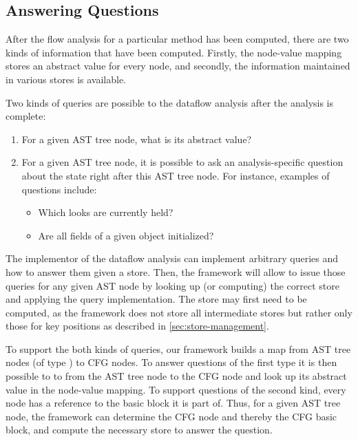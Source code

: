 \subsection{Answering Questions}
\begin{new}
After the flow analysis for a particular method has been computed, there are two kinds of
information that have been computed.  Firstly, the node-value mapping stores an abstract
value for every node, and secondly, the information maintained in various stores is
available.

Two kinds of queries are possible to the dataflow analysis after the analysis is complete:
\begin{enumerate}
    \item For a given AST tree node, what is its abstract value?
    \item For a given AST tree node, it is possible to ask an analysis-specific question
    about the state right after this AST tree node. For instance, examples of questions
    include:
    \begin{itemize}
        \item Which looks are currently held?
        \item Are all fields of a given object initialized?
    \end{itemize}
\end{enumerate}

The implementor
of the dataflow analysis can implement arbitrary queries and how to answer them
given a store. Then, the framework will allow to issue those queries for
any given AST node by looking up (or computing) the correct store and applying the query
implementation.
The store may first need to be computed, as the framework does not store all intermediate
stores but rather only those for key positions as described in \autoref{sec:store-management}.

To support the both kinds of queries, our framework builds a map from AST tree nodes (of type
) to CFG nodes.  To answer questions of the first type it is
then possible to to from the AST tree node to the CFG node and look up its abstract value in
the node-value mapping.  To support questions of the second kind, every node has a reference
to the basic block it is part of. Thus, for a given AST tree node, the framework
can determine the CFG node and thereby the CFG basic block, and compute the necessary store
to answer the question.

\end{new}




